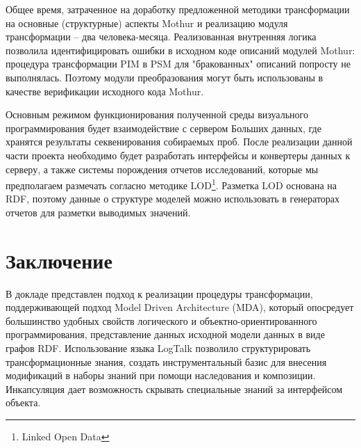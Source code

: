 \documentclass[conference]{IEEEtran} \IEEEoverridecommandlockouts
\begin{document}
Общее время, затраченное на доработку предложенной методики трансформации на основные (структурные) аспекты Mothur и реализацию модуля трансформации -- два человека-месяца. Реализованная внутренняя логика позволила идентифицировать ошибки в исходном коде описаний модулей Mothur: процедура трансформации PIM в PSM для "бракованных" описаний попросту не выполнялась. Поэтому модули преобразования могут быть использованы в качестве верификации исходного кода Mothur.

Основным режимом функционирования полученной среды визуального программирования будет взаимодействие с сервером Больших данных, где хранятся результаты секвенирования собираемых проб.  После реализации данной части проекта необходимо будет разработать интерфейсы и конвертеры данных к серверу, а также системы порождения отчетов исследований, которые мы предполагаем размечать согласно методике LOD\footnote{Linked Open Data}. Разметка LOD основана на RDF, поэтому данные о структуре моделей можно использовать в генераторах отчетов для разметки выводимых значений.

\section{Заключение}

В докладе представлен подход к реализации процедуры трансформации, поддерживающей подход Model Driven Architecture (MDA), который опосредует большинство удобных свойств логического и объектно-ориентированного программирования, представление данных исходной модели данных в виде графов RDF. Использование языка LogTalk позволило структурировать трансформационные знания, создать инструментальный базис для внесения модификаций в наборы знаний при помощи наследования и композиции. Инкапсуляция дает возможность скрывать специальные знаний за интерфейсом объекта.
\end{document}
